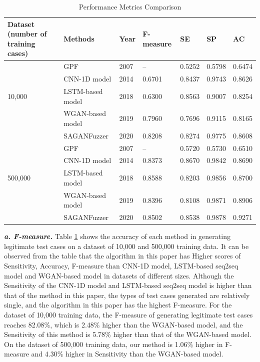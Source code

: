\begin{table}[]
	\centering
	\caption{Performance Metrics Comparison}
	\label{F-measure}
	\renewcommand{\arraystretch}{1.35}
	\begin{tabular}{ m{70pt}<{\centering} |m{70pt}<{\centering}|m{40pt}<{\centering}|m{60pt}<{\centering}|m{40pt}<{\centering}|m{40pt}<{\centering}|m{40pt}<{\centering}}
		\toprule
		\textbf{Dataset
			(number of training cases)} & \textbf{Methods}          & \textbf{Year} & \textbf{F-measure} & \textbf{SE}     & \textbf{SP}     & \textbf{AC}     \\ \midrule
		& GPF              & 2007 & --         & 0.5252 & 0.5798 & 0.6474 \\ \cmidrule(l){2-7} 
		& CNN-1D model     & 2014 & 0.6701    & 0.8437 & 0.9743 & 0.8626 \\ \cmidrule(l){2-7} 
		10,000  & LSTM-based model & 2018 & 0.6300    & 0.8563 & 0.9007 & 0.8254 \\ \cmidrule(l){2-7} 
		& WGAN-based model & 2019 & 0.7960    & 0.7696 & 0.9115 & 0.8165 \\ \cmidrule(l){2-7} 
		& SAGANFuzzer      & 2020 & 0.8208    & 0.8274 & 0.9775 & 0.8608 \\ \midrule
		& GPF              & 2007 & --         & 0.5720 & 0.5730 & 0.6510 \\ \cmidrule(l){2-7} 
		& CNN-1D model     & 2014 & 0.8373    & 0.8670 & 0.9842 & 0.8690 \\ \cmidrule(l){2-7} 
		500,000 & LSTM-based model & 2018 & 0.8588    & 0.8203 & 0.9856 & 0.8700 \\ \cmidrule(l){2-7} 
		& WGAN-based model & 2019 & 0.8396    & 0.8108 & 0.9871 & 0.8906 \\ \cmidrule(l){2-7} 
		& SAGANFuzzer      & 2020 & 0.8502    & 0.8538 & 0.9878 & 0.9271 \\ \bottomrule
	\end{tabular}
\end{table}

\quad \textit{\textbf{a. F-measure.}} Table \ref{F-measure} shows the accuracy of each method in generating legitimate test cases on a dataset of 10,000 and 500,000 training data. It can be observed from the table that the algorithm in this paper has Higher scores of Sensitivity, Accuracy, F-measure than CNN-1D model, LSTM-based seq2seq model and WGAN-based model in datasets of different sizes. Although the Sensitivity of the CNN-1D model and LSTM-based seq2seq model is higher than that of the method in this paper, the types of test cases generated are relatively single, and the algorithm in this paper has the highest F-measure. For the dataset of 10,000 training data, the F-measure of generating legitimate test cases reaches 82.08\%, which is 2.48\% higher than the WGAN-based model, and the Sensitivity of this method is 5.78\% higher than that of the WGAN-based model. On the dataset of 500,000 training data, our method is 1.06\% higher in F-measure and 4.30\% higher in Sensitivity than the WGAN-based model. 

